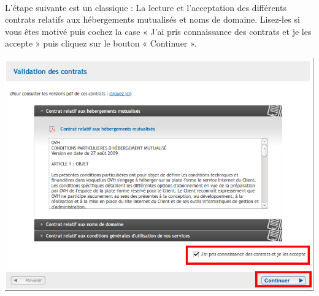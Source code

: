\documentclass[10pt,a4paper]{article}
\begin{document}
\paragraph{}L'étape suivante est un classique : La lecture et l'acceptation des différents contrats relatifs aux hébergements mutualisés et noms de domaine. Lisez-les si vous êtes motivé puis cochez la case « J'ai pris connaissance des contrats et je les accepte » puis cliquez sur le bouton « Continuer ».
\begin{center}
\includegraphics[scale=0.3]{img/0286.png}
\end{center}
\newpage
\end{document}
